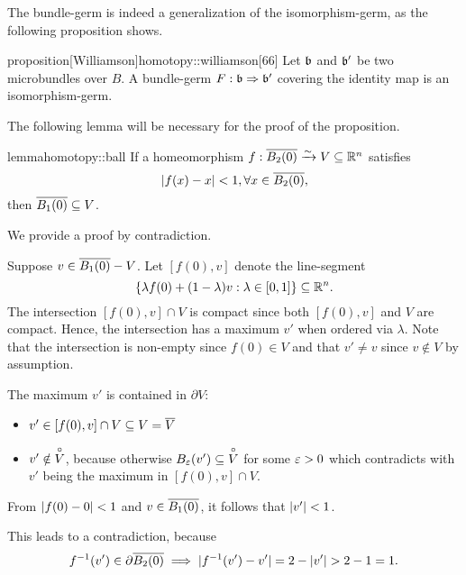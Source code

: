 \begin{myparagraph} The bundle-germ is indeed a generalization of the isomorphism-germ, as the following proposition shows. \end{myparagraph}

\begin{mystatement}{proposition}[Williamson]{homotopy::williamson}[66] Let $\bb$ and $\bb'$ be two microbundles over $B$. A bundle-germ $\germdef{F}{\bb}{\bb'}$ covering the identity map is an isomorphism-germ. \end{mystatement}

\begin{myparagraph} The following lemma will be necessary for the proof of the proposition. \end{myparagraph}

\begin{mystatement}{lemma}{homotopy::ball} If a homeomorphism $f: \clball[2] \isomto V \sub \R^n$ satisfies \[ \abs{f(x) - x} < 1, \forall x \in \clball[2], \] then $\clball[1] \sub V$. \end{mystatement}

\begin{myproof} We provide a proof by contradiction.

Suppose $v \in \clball[1] - V$. Let $[f(0), v]$ denote the line-segment \[ \{\lambda f(0) + (1 - \lambda) v:\lambda \in [0, 1]\} \subseteq{} \mathbb{R}^n. \] The intersection $[f(0), v] \cap V$ is compact since both $[f(0), v]$ and $V$ are compact. Hence, the intersection has a maximum $v'$ when ordered via $\lambda$. Note that the intersection is non-empty since $f(0) \in V$ and that $v' \neq v$ since $v \notin V$ by assumption.

The maximum $v'$ is contained in $\partial V$: \begin{itemize} \item $v' \in [f(0), v] \cap V \subseteq{} V = \overline{V}$ \item $v' \notin \overset{\circ}{V}$, because otherwise $\ball[\eps][v'] \sub \inner{V}$ for some $\varepsilon{} > 0$ which contradicts with $v'$ being the maximum in $[f(0), v] \cap V$. \end{itemize}

From $\vert{} f(0) - 0 \vert{} < 1$ and $v \in \clball[1]$, it follows that $\vert{} v' \vert{} < 1$.

This leads to a contradiction, because \[ \inv{f}(v') \in \partial\clball[2] \implies \abs{\inv{f}(v') - v'} = 2 - \abs{v'} > 2 - 1 = 1. \] \end{myproof}